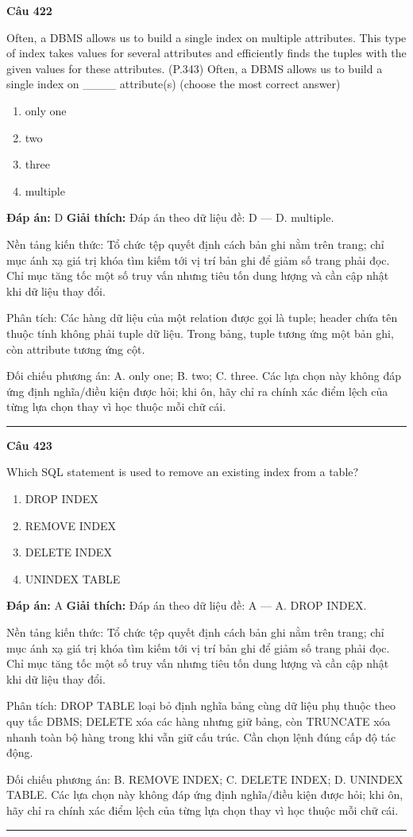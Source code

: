 \documentclass[11pt,a4paper]{article}
\newenvironment{question}[1]{%
  \par\vspace{1em}\noindent\textbf{\large Câu #1}\par\vspace{0.4em}
}{%
  \par\vspace{1em}\hrule\vspace{0.6em}
}
\newenvironment{choices}{%
  \begin{enumerate}[label=\textbf{\Alph*.},leftmargin=2.2em,itemsep=2pt,topsep=3pt]
}{%
  \end{enumerate}
}
\newcommand{\choice}{\item}
\begin{document}
\begin{question}{422}
Often, a DBMS allows us to build a single index on multiple attributes. This type of index takes values for several attributes and efficiently finds the tuples with the given values for these attributes. (P.343)
Often, a DBMS allows us to build a single index on ____ attribute(s)
(choose the most correct answer)
\begin{choices}
\choice only one
\choice two
\choice three
\choice multiple
\end{choices}
\textbf{Đáp án:} D
\textbf{Giải thích:} Đáp án theo dữ liệu đề: D — D. multiple.

Nền tảng kiến thức: Tổ chức tệp quyết định cách bản ghi nằm trên trang; chỉ mục ánh xạ giá trị khóa tìm kiếm tới vị trí bản ghi để giảm số trang phải đọc. Chỉ mục tăng tốc một số truy vấn nhưng tiêu tốn dung lượng và cần cập nhật khi dữ liệu thay đổi.

Phân tích: Các hàng dữ liệu của một relation được gọi là tuple; header chứa tên thuộc tính không phải tuple dữ liệu. Trong bảng, tuple tương ứng một bản ghi, còn attribute tương ứng cột.

Đối chiếu phương án: A. only one; B. two; C. three. Các lựa chọn này không đáp ứng định nghĩa/điều kiện được hỏi; khi ôn, hãy chỉ ra chính xác điểm lệch của từng lựa chọn thay vì học thuộc mỗi chữ cái.
\end{question}

\begin{question}{423}
Which SQL statement is used to remove an existing index from a table?
\begin{choices}
\choice DROP INDEX
\choice REMOVE INDEX
\choice DELETE INDEX
\choice UNINDEX TABLE
\end{choices}
\textbf{Đáp án:} A
\textbf{Giải thích:} Đáp án theo dữ liệu đề: A — A. DROP INDEX.

Nền tảng kiến thức: Tổ chức tệp quyết định cách bản ghi nằm trên trang; chỉ mục ánh xạ giá trị khóa tìm kiếm tới vị trí bản ghi để giảm số trang phải đọc. Chỉ mục tăng tốc một số truy vấn nhưng tiêu tốn dung lượng và cần cập nhật khi dữ liệu thay đổi.

Phân tích: DROP TABLE loại bỏ định nghĩa bảng cùng dữ liệu phụ thuộc theo quy tắc DBMS; DELETE xóa các hàng nhưng giữ bảng, còn TRUNCATE xóa nhanh toàn bộ hàng trong khi vẫn giữ cấu trúc. Cần chọn lệnh đúng cấp độ tác động.

Đối chiếu phương án: B. REMOVE INDEX; C. DELETE INDEX; D. UNINDEX TABLE. Các lựa chọn này không đáp ứng định nghĩa/điều kiện được hỏi; khi ôn, hãy chỉ ra chính xác điểm lệch của từng lựa chọn thay vì học thuộc mỗi chữ cái.
\end{question}
\end{document}
